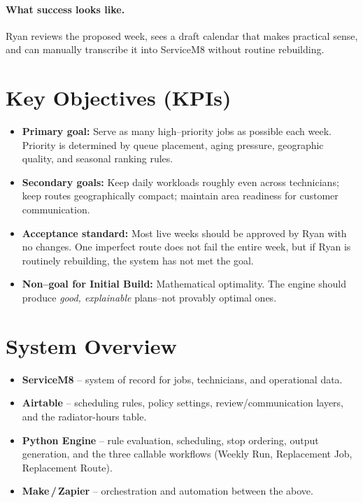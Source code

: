 \documentclass[12pt]{article}
\begin{document}
\paragraph{What success looks like.}
Ryan reviews the proposed week, sees a draft calendar that makes practical sense, and can manually transcribe it into ServiceM8 without routine rebuilding.

\section*{Key Objectives (KPIs)}
\begin{itemize}
    \item \textbf{Primary goal:} Serve as many high--priority jobs as possible each week.  Priority is determined by queue placement, aging pressure, geographic quality, and seasonal ranking rules.
    \item \textbf{Secondary goals:} Keep daily workloads roughly even across technicians; keep routes geographically compact; maintain area readiness for customer communication.
    \item \textbf{Acceptance standard:} Most live weeks should be approved by Ryan with no changes.  One imperfect route does not fail the entire week, but if Ryan is routinely rebuilding, the system has not met the goal.
    \item \textbf{Non--goal for Initial Build:} Mathematical optimality.  The engine should produce \emph{good, explainable} plans--not provably optimal ones.
\end{itemize}

\section*{System Overview}

\begin{itemize}
    \item \textbf{ServiceM8} -- system of record for jobs, technicians, and operational data.
    \item \textbf{Airtable} -- scheduling rules, policy settings, review/communication layers, and the radiator-hours table.
    \item \textbf{Python Engine} -- rule evaluation, scheduling, stop ordering, output generation, and the three callable workflows (Weekly Run, Replacement Job, Replacement Route).
    \item \textbf{Make\,/\,Zapier} -- orchestration and automation between the above.
\end{itemize}
\end{document}
